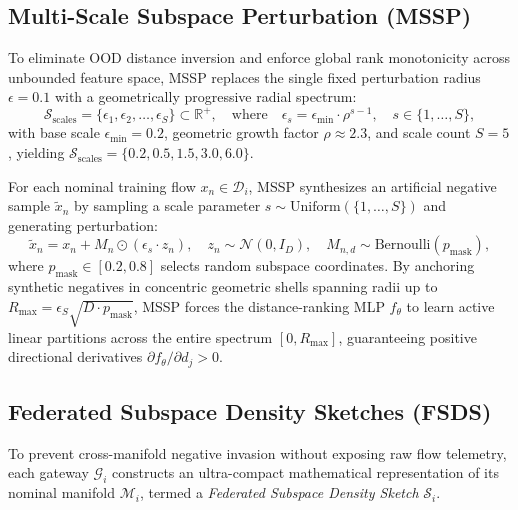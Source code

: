 \subsection{Multi-Scale Subspace Perturbation (MSSP)}
\label{subsec:mssp}

To eliminate OOD distance inversion and enforce global rank monotonicity across unbounded feature space, MSSP replaces the single fixed perturbation radius $\epsilon = 0.1$ with a geometrically progressive radial spectrum:
\begin{equation}
\label{eq:scale_spectrum}
\mathcal{S}_{\text{scales}} = \{\epsilon_1, \epsilon_2, \dots, \epsilon_S\} \subset \mathbb{R}^+, \quad \text{where} \quad \epsilon_s = \epsilon_{\min} \cdot \rho^{s-1}, \quad s \in \{1, \dots, S\},
\end{equation}
with base scale $\epsilon_{\min} = 0.2$, geometric growth factor $\rho \approx 2.3$, and scale count $S = 5$, yielding $\mathcal{S}_{\text{scales}} = \{0.2, 0.5, 1.5, 3.0, 6.0\}$.

For each nominal training flow $x_n \in \mathcal{D}_i$, MSSP synthesizes an artificial negative sample $\tilde{x}_n$ by sampling a scale parameter $s \sim \text{Uniform}(\{1, \dots, S\})$ and generating perturbation:
\begin{equation}
\label{eq:mssp_perturbation}
\tilde{x}_n = x_n + M_n \odot (\epsilon_s \cdot z_n), \quad z_n \sim \mathcal{N}(0, I_D), \quad M_{n,d} \sim \text{Bernoulli}(p_{\text{mask}}),
\end{equation}
where $p_{\text{mask}} \in [0.2, 0.8]$ selects random subspace coordinates. By anchoring synthetic negatives in concentric geometric shells spanning radii up to $R_{\max} = \epsilon_S \sqrt{D \cdot p_{\text{mask}}}$, MSSP forces the distance-ranking MLP $f_\theta$ to learn active linear partitions across the entire spectrum $[0, R_{\max}]$, guaranteeing positive directional derivatives $\partial f_\theta / \partial d_j > 0$.

\subsection{Federated Subspace Density Sketches (FSDS)}
\label{subsec:fsds}

To prevent cross-manifold negative invasion without exposing raw flow telemetry, each gateway $\mathcal{G}_i$ constructs an ultra-compact mathematical representation of its nominal manifold $\mathcal{M}_i$, termed a \emph{Federated Subspace Density Sketch} $\mathcal{S}_i$.


